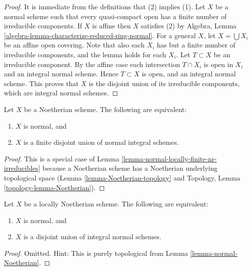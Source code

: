 \begin{proof}
It is immediate from the definitions that (2) implies (1).
Let $X$ be a normal scheme such that every quasi-compact open
has a finite number of irreducible components.
If $X$ is affine then $X$ satisfies (2) by
Algebra, Lemma \ref{algebra-lemma-characterize-reduced-ring-normal}.
For a general $X$, let $X = \bigcup X_i$ be
an affine open covering. Note that also each $X_i$ has
but a finite number of irreducible components, and the lemma holds
for each $X_i$. Let $T \subset X$ be an irreducible component.
By the affine case each intersection $T \cap X_i$ is open in $X_i$
and an integral normal scheme.
Hence $T \subset X$ is open, and an integral normal scheme.
This proves that $X$ is the disjoint union of its irreducible components,
which are integral normal schemes.
\end{proof}

\begin{lemma}
\label{lemma-normal-Noetherian}
Let $X$ be a Noetherian scheme.
The following are equivalent:
\begin{enumerate}
\item $X$ is normal, and
\item $X$ is a finite disjoint union of normal integral schemes.
\end{enumerate}
\end{lemma}

\begin{proof}
This is a special case of
Lemma \ref{lemma-normal-locally-finite-nr-irreducibles} because a Noetherian
scheme has a Noetherian underlying topological space
(Lemma \ref{lemma-Noetherian-topology}
and
Topology, Lemma \ref{topology-lemma-Noetherian}).
\end{proof}

\begin{lemma}
\label{lemma-normal-locally-Noetherian}
Let $X$ be a locally Noetherian scheme.
The following are equivalent:
\begin{enumerate}
\item $X$ is normal, and
\item $X$ is a disjoint union of integral normal schemes.
\end{enumerate}
\end{lemma}

\begin{proof}
Omitted. Hint: This is purely topological from
Lemma \ref{lemma-normal-Noetherian}.
\end{proof}

